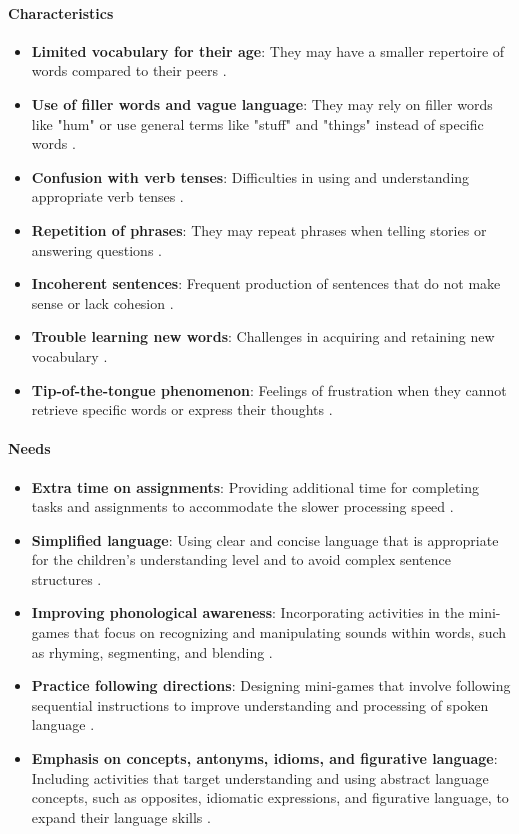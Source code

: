 \paragraph{Characteristics}
\begin{itemize}
    \item \textbf{Limited vocabulary for their age}: They may have a smaller repertoire of words compared to their peers \cite{vanderbilt}.
    \item \textbf{Use of filler words and vague language}: They may rely on filler words like "hum" or use general terms like "stuff" and "things" instead of specific words \cite{additude}.
    \item \textbf{Confusion with verb tenses}: Difficulties in using and understanding appropriate verb tenses \cite{greatspeech}.
    \item \textbf{Repetition of phrases}: They may repeat phrases when telling stories or answering questions \cite{vanderbilt}.
    \item \textbf{Incoherent sentences}: Frequent production of sentences that do not make sense or lack cohesion \cite{gow}.
    \item \textbf{Trouble learning new words}: Challenges in acquiring and retaining new vocabulary \cite{additude}.
    \item \textbf{Tip-of-the-tongue phenomenon}: Feelings of frustration when they cannot retrieve specific words or express their thoughts \cite{vanderbilt}.
\end{itemize}

\paragraph{Needs}
\begin{itemize}
    \item \textbf{Extra time on assignments}: Providing additional time for completing tasks and assignments to accommodate the slower processing speed \cite{vanderbilt}.
    \item \textbf{Simplified language}: Using clear and concise language that is appropriate for the children's understanding level and to avoid complex sentence structures \cite{additude}.
    \item \textbf{Improving phonological awareness}: Incorporating activities in the mini-games that focus on recognizing and manipulating sounds within words, such as rhyming, segmenting, and blending \cite{gow}.
    \item \textbf{Practice following directions}: Designing mini-games that involve following sequential instructions to improve understanding and processing of spoken language \cite{vanderbilt}.
    \item \textbf{Emphasis on concepts, antonyms, idioms, and figurative language}: Including activities that target understanding and using abstract language concepts, such as opposites, idiomatic expressions, and figurative language, to expand their language skills \cite{greatspeech}.
\end{itemize}

